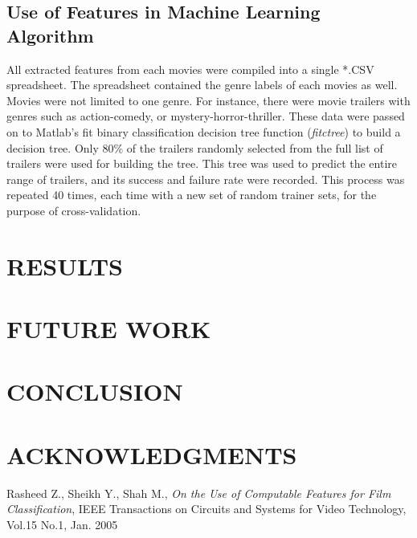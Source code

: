 \documentclass[letterpaper, 10 pt, conference]{ieeeconf}  %
\begin{document}
\subsection{Use of Features in Machine Learning Algorithm}
All extracted features from each movies were compiled into a single *.CSV spreadsheet. The spreadsheet contained the genre labels of each movies as well. Movies were not limited to one genre. For instance, there were movie trailers with genres such as action-comedy, or mystery-horror-thriller. These data were passed on to Matlab's fit binary classification decision tree function (\textit{fitctree}) to build a decision tree. Only 80\% of the trailers randomly selected from the full list of trailers were used for building the tree. This tree was used to predict the entire range of trailers, and its success and failure rate were recorded. This process was repeated 40 times, each time with a new set of random trainer sets, for the purpose of cross-validation. 



\section{RESULTS}


\section{FUTURE WORK}



\section{CONCLUSION}



\section{ACKNOWLEDGMENTS}




\begin{thebibliography}{99}
Rasheed Z., Sheikh Y., Shah M., {\it On the Use of Computable Features for Film Classification}, IEEE Transactions on Circuits and Systems for Video Technology, Vol.15 No.1, Jan. 2005
\end{thebibliography}
\end{document}
